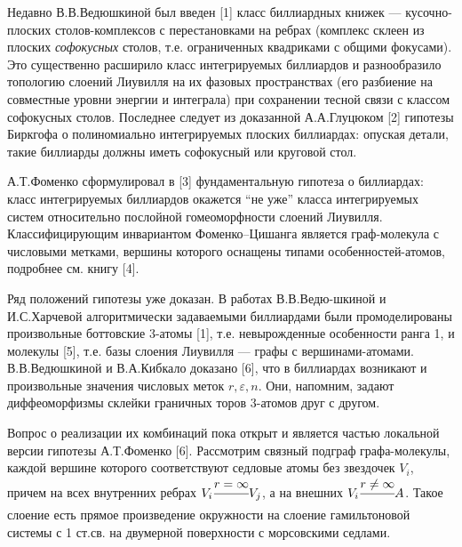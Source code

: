 
\vzmscaption

Недавно В.В.Ведюшкиной был введен [1] класс биллиардных книжек --- кусочно-плоских столов-комплексов с перестановками на ребрах (комплекс склеен из плоских \textit{софокусных} столов, т.е. ограниченных квадриками с общими фокусами). Это существенно расширило класс интегрируемых биллиардов и разнообразило топологию слоений Лиувилля на их фазовых пространствах (его разбиение на совместные уровни энергии и интеграла) при сохранении тесной связи с классом софокусных столов. Последнее следует из доказанной А.А.Глуцюком [2] гипотезы Биркгофа о полиномиально интегрируемых плоских биллиардах: опуская детали, такие биллиарды должны иметь  софокусный или круговой стол. 

А.Т.Фоменко сформулировал в [3] фундаментальную гипотеза о биллиардах:  класс интегрируемых биллиардов окажется ``не уже'' класса интегрируемых систем относительно послойной гомеоморфности слоений Лиувилля. Классифицирующим инвариантом Фоменко--Цишанга является граф-молекула с числовыми метками, вершины которого оснащены типами особенностей-атомов, подробнее см. книгу [4].

Ряд положений гипотезы уже доказан. В работах В.В.Ведю-шкиной и И.С.Харчевой алгоритмически задаваемыми биллиардами были промоделированы произвольные боттовские 3-атомы [1], т.е. невырожденные особенности ранга 1, и молекулы [5], т.е. базы слоения Лиувилля --- графы с вершинами-атомами. В.В.Ведюшкиной и В.А.Кибкало доказано [6], что в биллиардах возникают и произвольные значения числовых меток $r, \varepsilon, n$. Они, напомним, задают диффеоморфизмы склейки граничных торов 3-атомов друг с другом. 

Вопрос о реализации их комбинаций пока открыт и является частью локальной версии гипотезы А.Т.Фоменко [6]. Рассмотрим связный подграф графа-молекулы, каждой вершине которого соответствуют седловые атомы без звездочек $V_i$, причем на всех внутренних ребрах $V_i \cfrac{r = \infty}{}V_j$, а на внешних $V_i \cfrac{r \ne \infty}{}A$. Такое слоение есть прямое произведение окружности на слоение гамильтоновой системы с 1 ст.св. на двумерной поверхности с морсовскими седлами. 

